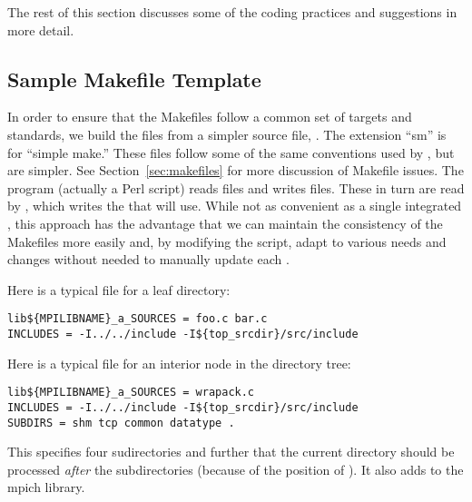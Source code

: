 \documentclass{article}
\begin{document}
The rest of this section discusses some of the coding practices and
suggestions in more detail.

\subsection{Sample Makefile Template}
\label{sec:makefile-template}

In order to ensure that the Makefiles follow a common set of targets and
standards, we build the  files from a simpler source file,
.  The extension ``sm'' is for ``simple make.''  These files
follow some of the same conventions used by , but are simpler.
See Section~\ref{sec:makefiles} for more discussion of Makefile issues.
The program (actually a Perl script)  reads
 files and writes  files.  These in turn
are read by , which writes the  that
 will use.  While not as convenient as a single integrated
, this approach has the advantage that we can maintain the
consistency of the Makefiles more easily and, by modifying the
 script, adapt to various needs and changes without needed to
manually update each .

Here is a typical  file for a leaf directory:
\begin{verbatim}
lib${MPILIBNAME}_a_SOURCES = foo.c bar.c
INCLUDES = -I../../include -I${top_srcdir}/src/include
\end{verbatim}

Here is a typical  file for an interior node in the
directory tree:
\begin{verbatim}
lib${MPILIBNAME}_a_SOURCES = wrapack.c 
INCLUDES = -I../../include -I${top_srcdir}/src/include
SUBDIRS = shm tcp common datatype .
\end{verbatim}
This specifies four sudirectories and further that the current directory
should be processed \emph{after} the subdirectories (because of the position
of ).  It also adds  to the mpich library.
\end{document}
